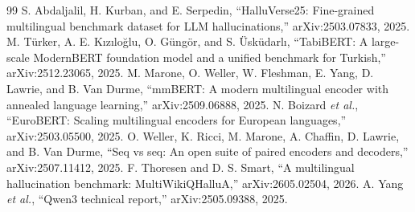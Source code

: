 \documentclass[conference,a4paper]{IEEEtran}
\begin{document}
\begin{thebibliography}{99}
 S. Abdaljalil, H. Kurban, and E. Serpedin, ``HalluVerse25: Fine-grained multilingual benchmark dataset for LLM hallucinations,'' arXiv:2503.07833, 2025.
 M. Türker, A. E. Kızıloğlu, O. Güngör, and S. Üsküdarlı, ``TabiBERT: A large-scale ModernBERT foundation model and a unified benchmark for Turkish,'' arXiv:2512.23065, 2025.
 M. Marone, O. Weller, W. Fleshman, E. Yang, D. Lawrie, and B. Van Durme, ``mmBERT: A modern multilingual encoder with annealed language learning,'' arXiv:2509.06888, 2025.
 N. Boizard \emph{et al.}, ``EuroBERT: Scaling multilingual encoders for European languages,'' arXiv:2503.05500, 2025.
 O. Weller, K. Ricci, M. Marone, A. Chaffin, D. Lawrie, and B. Van Durme, ``Seq vs seq: An open suite of paired encoders and decoders,'' arXiv:2507.11412, 2025.
 F. Thoresen and D. S. Smart, ``A multilingual hallucination benchmark: MultiWikiQHalluA,'' arXiv:2605.02504, 2026.
 A. Yang \emph{et al.}, ``Qwen3 technical report,'' arXiv:2505.09388, 2025.
\end{thebibliography}
\end{document}
